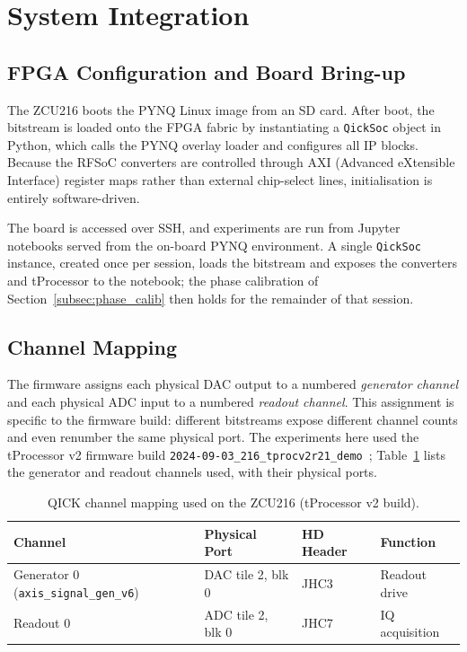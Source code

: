 \section{System Integration}
\label{sec:integration}

\subsection{FPGA Configuration and Board Bring-up}

The ZCU216 boots the PYNQ Linux image from an SD card.  After boot, the
\QICK{} bitstream is loaded onto the FPGA fabric by instantiating a
\texttt{QickSoc} object in Python, which calls the PYNQ overlay loader and
configures all IP blocks.  Because the RFSoC converters are controlled through
AXI (Advanced eXtensible Interface) register maps rather than external
chip-select lines, initialisation is
entirely software-driven.

The board is accessed over SSH, and experiments are run from Jupyter notebooks
served from the on-board PYNQ environment.  A single \texttt{QickSoc} instance,
created once per session, loads the bitstream and exposes the converters and
tProcessor to the notebook; the phase calibration of
Section~\ref{subsec:phase_calib} then holds for the remainder of that session.

\subsection{Channel Mapping}

The \QICK{} firmware assigns each physical DAC output to a numbered
\emph{generator channel} and each physical ADC input to a numbered
\emph{readout channel}.  This assignment is specific to the firmware build:
different bitstreams expose different channel counts and even renumber the same
physical port.  The experiments here used the tProcessor v2 firmware build
\texttt{2024-09-03\_216\_tprocv2r21\_demo}~\cite{QICKtprocv2}; Table~\ref{tab:channels}
lists the generator and readout channels used, with their physical ports.

\begin{table}[ht]
\centering
\caption{QICK channel mapping used on the ZCU216 (tProcessor v2 build).}
\label{tab:channels}
\begin{tabular}{llll}
\toprule
\QICK{} Channel & Physical Port & HD Header & Function \\
\midrule
Generator 0 (\texttt{axis\_signal\_gen\_v6}) & DAC tile 2, blk 0 & JHC3 & Readout drive \\
Readout 0                                    & ADC tile 2, blk 0 & JHC7 & IQ acquisition \\
\bottomrule
\end{tabular}
\end{table}

